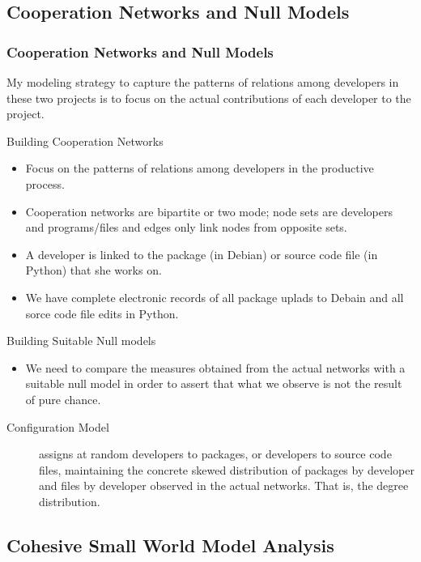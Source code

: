 \documentclass[ignorenonframetext,red,8pt,notes=hide]{beamer}
\begin{document}
\subsection{Cooperation Networks and Null Models}

\begin{frame}
\frametitle{Cooperation Networks and Null Models}

My modeling strategy to capture the patterns of relations among developers in these two projects is to focus on the actual contributions of each developer to the project. 

\begin{block}{Building Cooperation Networks}
\begin{itemize}
\item Focus on the patterns of relations among developers in the productive process.
\item Cooperation networks are bipartite or two mode; node sets are developers and programs/files and edges only link nodes from opposite sets.
\item A developer is linked to the package (in Debian) or source code file (in Python) that she works on.
\item We have complete electronic records of all package uplads to Debain and all sorce code file edits in Python.
\end{itemize}
\end{block}

\pause

\begin{block}{Building Suitable Null models}
\begin{itemize}
\item We need to compare the measures obtained from the actual networks with a suitable null model in order to assert that what we observe is not the result of pure chance.
\end{itemize}
\begin{description}
\item [Configuration Model] assigns at random developers to packages, or developers to source code files, maintaining the concrete skewed distribution of packages by developer and files by developer observed in the actual networks. That is, the degree distribution.
\end{description}
\end{block}

\end{frame}


\subsection{Cohesive Small World Model Analysis}
\end{document}
